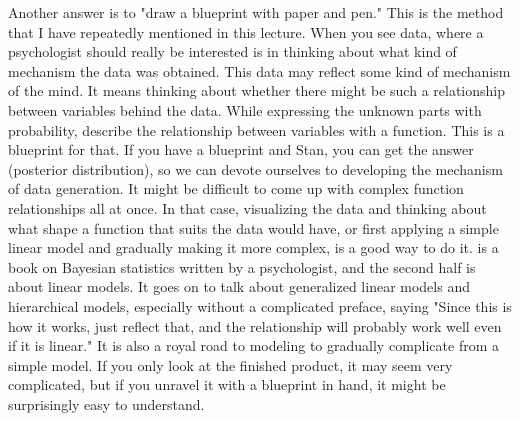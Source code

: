 \documentclass{ltjsbook}
\begin{document}
Another answer is to "draw a blueprint with paper and pen." This is the method that I have repeatedly mentioned in this lecture. When you see data, where a psychologist should really be interested is in thinking about what kind of mechanism the data was obtained. This data may reflect some kind of mechanism of the mind. It means thinking about whether there might be such a relationship between variables behind the data. While expressing the unknown parts with probability, describe the relationship between variables with a function. This is a blueprint for that. If you have a blueprint and Stan, you can get the answer (posterior distribution), so we can devote ourselves to developing the mechanism of data generation. It might be difficult to come up with complex function relationships all at once. In that case, visualizing the data and thinking about what shape a function that suits the data would have, or first applying a simple linear model and gradually making it more complex, is a good way to do it. \textcite{Maeda2017} is a book on Bayesian statistics written by a psychologist, and the second half is about linear models. It goes on to talk about generalized linear models and hierarchical models, especially without a complicated preface, saying "Since this is how it works, just reflect that, and the relationship will probably work well even if it is linear." It is also a royal road to modeling to gradually complicate from a simple model. If you only look at the finished product, it may seem very complicated, but if you unravel it with a blueprint in hand, it might be surprisingly easy to understand.
\end{document}
